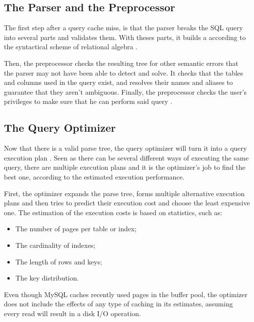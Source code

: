 \documentclass[12pt]{article}
\begin{document}
\subsection{The Parser and the Preprocessor}
\label{parserAndPrepocessor}
The first step after a query cache miss, is that the parser breaks the SQL query into several parts and validates them. With theses parts, it builds a  according to the syntactical scheme of relational algebra \parencite{DatabaseJournal}.

Then, the preprocessor checks the resulting tree for other semantic errors that the parser may not have been able to detect and solve. It checks that the tables and columns used in the query exist, and resolves their names and aliases to guarantee that they aren't ambiguous. Finally, the preprocessor checks the user's privileges to make sure that he can perform said query \parencite{QueryOptimizationBook}.


\subsection{The Query Optimizer}
\label{queryOptimizer}
Now that there is a valid parse tree, the query optimizer will turn it into a query execution plan \parencite{QueryOptimizationBook}. Seen as there can be several different ways of executing the same query, there are multiple execution plans and it is the optimizer's job to find the best one, according to the estimated execution performance.

First, the optimizer expands the parse tree, forms multiple alternative execution plans and then tries to predict their execution cost and choose the least expensive one. The estimation of the execution costs is based on statistics, such as:
\begin{itemize}
    \item The number of pages per table or index;
    \item The cardinality of indexes;
    \item The length of rows and keys;
    \item The key distribution.
\end{itemize}

Even though MySQL caches recently used pages in the buffer pool, the optimizer does not include the effects of any type of caching in its estimates, assuming every read will result in a disk I/O operation.
\end{document}
